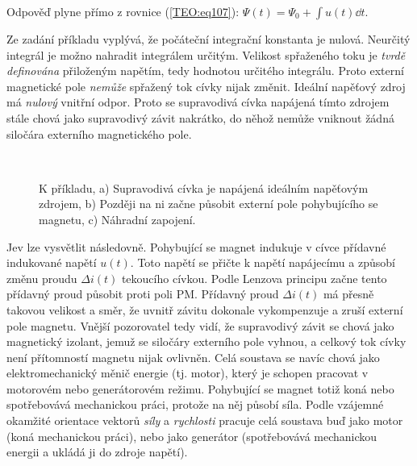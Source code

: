     Odpověď plyne přímo z rovnice (\ref{TEO:eq107}): \(\Psi(t) = \Psi_0 +\int u(t)\dd{t}\).
    
    Ze zadání příkladu vyplývá, že počáteční integrační konstanta je nulová. Neurčitý integrál je
    možno nahradit integrálem určitým. Velikost spřaženého toku je \emph{tvrdě definována}
    přiloženým napětím, tedy hodnotou určitého integrálu. Proto externí magnetické pole 
    \emph{nemůže} spřažený tok cívky nijak změnit. Ideální napěťový zdroj má \emph{nulový} 
    vnitřní odpor. Proto se supravodivá cívka napájená tímto zdrojem stále chová jako supravodivý
    závit nakrátko, do něhož nemůže vniknout žádná siločára externího magnetického pole.
    
    \begin{figure}[ht!]
      \centering  
      \hspace{1em}
              \\               
      \caption{K příkladu, a) Supravodivá cívka je napájená ideálním napěťovým zdrojem, b) Později
               na ni začne působit externí pole pohybujícího se magnetu, c) Náhradní zapojení.} 
      \label{teo:fig042}
    \end{figure}
  
    Jev lze vysvětlit následovně. Pohybující se magnet indukuje v cívce přídavné indukované napětí
    \(u(t)\). Toto napětí se přičte k napětí napájecímu a způsobí změnu proudu \(\Delta i(t)\)
    tekoucího cívkou. Podle Lenzova principu začne tento přídavný proud působit proti poli PM.
    Přídavný proud \(\Delta i(t)\) má přesně takovou velikost a směr, že uvnitř závitu dokonale
    vykompenzuje a zruší externí pole magnetu. Vnější pozorovatel tedy vidí, že supravodivý závit se
    chová jako magnetický izolant, jemuž se siločáry externího pole vyhnou, a celkový tok cívky není
    přítomností magnetu nijak ovlivněn. Celá soustava se navíc chová jako elektromechanický měnič
    energie (tj. motor), který je schopen pracovat v motorovém nebo generátorovém režimu. Pohybující
    se magnet totiž koná nebo spotřebovává mechanickou práci, protože na něj působí síla. Podle
    vzájemné okamžité orientace vektorů \emph{síly} a \emph{rychlosti} pracuje celá soustava buď
    jako motor (koná mechanickou práci), nebo jako generátor (spotřebovává mechanickou energii a
    ukládá ji do zdroje napětí).

